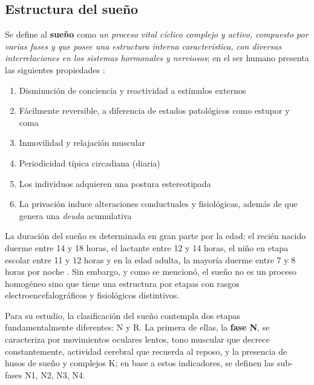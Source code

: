 \subsection{Estructura del sueño}

Se define al \textbf{sueño} como \textit{un proceso vital cíclico complejo y activo, compuesto por 
varias fases y que posee una estructura interna característica, con diversas interrelaciones en los 
sistemas hormonales y nerviosos};
en el ser humano presenta las siguientes propiedades \cite{CarrilloMora}:
\begin{enumerate}
\item Disminución de conciencia y reactividad a estímulos externos
\item Fácilmente reversible, a diferencia de estados patológicos como estupor y coma
\item Inmovilidad y relajación muscular
\item Periodicidad típica circadiana (diaria)
\item Los individuos adquieren una postura estereotipada
\item La privación induce alteraciones conductuales y 
fisiológicas, además de que genera una \textit{deuda} acumulativa
\end{enumerate}

La duración del sueño es determinada en gran parte por la edad; el recién nacido duerme entre 14 y 
18 horas, el lactante entre 12 y 14 horas, el niño en etapa escolar entre 11 y 12 horas y en la 
edad adulta, la mayoría duerme entre 7 y 8 horas por noche \cite{Contreras13}.
Sin embargo, y como se mencionó, el sueño no es un proceso homogéneo sino que tiene una estructura 
por etapas con rasgos electroencefalográficos y fisiológicos distintivos.

Para su estudio, la clasificación del sueño 
contempla dos etapas fundamentalmente diferentes: N y R.
La primera de ellas, la \textbf{fase N}, se caracteriza por movimientos oculares lentos, tono 
muscular que decrece constantemente, actividad cerebral que recuerda al reposo, y la presencia de
husos de sueño y complejos K; en base a estos indicadores, se definen las sub-fases N1, N2, N3, N4.
%

